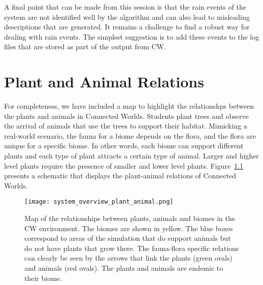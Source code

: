 \begin{appendices}
A final point that can be made from this session is that the rain events of the system are not identified well by the algorithm and can also lead to misleading descriptions that are generated. It remains a challenge to find a robust way for dealing with rain events. The simplest suggestion is to add these events to the log files that are stored as part of the output from CW.





\chapter{Plant and Animal Relations}\label{cha:appendix2}
For completeness, we have included a map to highlight the relationshps between the plants and animals in Connected Worlds. Students plant trees and observe the arrival of animals that use the trees to support their habitat. Mimicking a real-world scenario, the fauna for a biome depends on the flora, and the flora are unique for a specific biome. In other words, each biome can support different plants and each type of plant attracts a certain type of animal. Larger and higher level plants require the presence of smaller and lower level plants. Figure~\ref{fig:system_overview_plant_animal} presents a schematic that displays the plant-animal relations of Connected Worlds.

\begin{figure}
\centering
\texttt{[image: system\_overview\_plant\_animal.png]}
\caption{Map of the relationships between plants, animals and biomes in the CW environment. The biomes are shown in yellow. The blue boxes correspond to areas of the simulation that do support animals but do not have plants that grow there. The fauna-flora specific relations can clearly be seen by the arrows that link the plants (green ovals) and animals (red ovals). The plants and animals are endemic to their biome.}
\label{fig:system_overview_plant_animal}
\end{figure}

\end{appendices}
